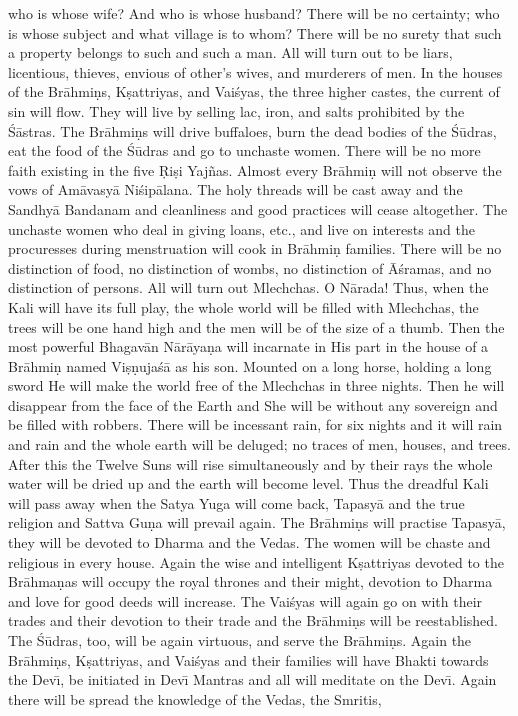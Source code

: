 who is whose wife? And who is whose husband? There will be no certainty; who is whose subject and what village is to whom? There will be no surety that such a property belongs to such and such a man. All will turn out to be liars, licentious, thieves, envious of other's wives, and murderers of men. In the houses of the Br\=ahmi\d{n}s, K\d{s}attriyas, and Vai\'syas, the three higher castes, the current of sin will flow. They will live by selling lac, iron, and salts prohibited by the \'S\=astras. The Br\=ahmi\d{n}s will drive buffaloes, burn the dead bodies of the \'S\=udras, eat the food of the \'S\=udras and go to unchaste women. There will be no more faith existing in the five \d{R}i\d{s}i Yaj\~nas. Almost every Br\=ahmi\d{n} will not observe the vows of Am\=avasy\=a Ni\'sip\=alana. The holy threads will be cast away and the Sandhy\=a Bandanam and cleanliness and good practices will cease altogether. The unchaste women who deal in giving loans, etc., and live on interests and the procuresses during menstruation will cook in Br\=ahmi\d{n} families. There will be no distinction of food, no distinction of wombs, no distinction of \=A\'sramas, and no distinction of persons. All will turn out Mlechchas. O N\=arada! Thus, when the Kali will have its full play, the whole world will be filled with Mlechchas, the trees will be one hand high and the men will be of the size of a thumb. Then the most powerful Bhagav\=an N\=ar\=aya\d{n}a will incarnate in His part in the house of a Br\=ahmi\d{n} named Vi\d{s}\d{n}uja\'s\=a as his son. Mounted on a long horse, holding a long sword He will make the world free of the Mlechchas in three nights. Then he will disappear from the face of the Earth and She will be without any sovereign and be filled with robbers. There will be incessant rain, for six nights and it will rain and rain and the whole earth will be deluged; no traces of men, houses, and trees. After this the Twelve Suns will rise simultaneously and by their rays the whole water will be dried up and the earth will become level. Thus the dreadful Kali will pass away when the Satya Yuga will come back, Tapasy\=a and the true religion and Sattva Gu\d{n}a will prevail again. The Br\=ahmi\d{n}s will practise Tapasy\=a, they will be devoted to Dharma and the Vedas. The women will be chaste and religious in every house. Again the wise and intelligent K\d{s}attriyas devoted to the Br\=ahma\d{n}as will occupy the royal thrones and their might, devotion to Dharma and love for good deeds will increase. The Vai\'syas will again go on with their trades and their devotion to their trade and the Br\=ahmi\d{n}s will be reestablished. The \'S\=udras, too, will be again virtuous, and serve the Br\=ahmi\d{n}s. Again the Br\=ahmi\d{n}s, K\d{s}attriyas, and Vai\'syas and their families will have Bhakti towards the Dev\={\i}, be initiated in Dev\={\i} Mantras and all will meditate on the Dev\={\i}. Again there will be spread the knowledge of the Vedas, the Smritis,

